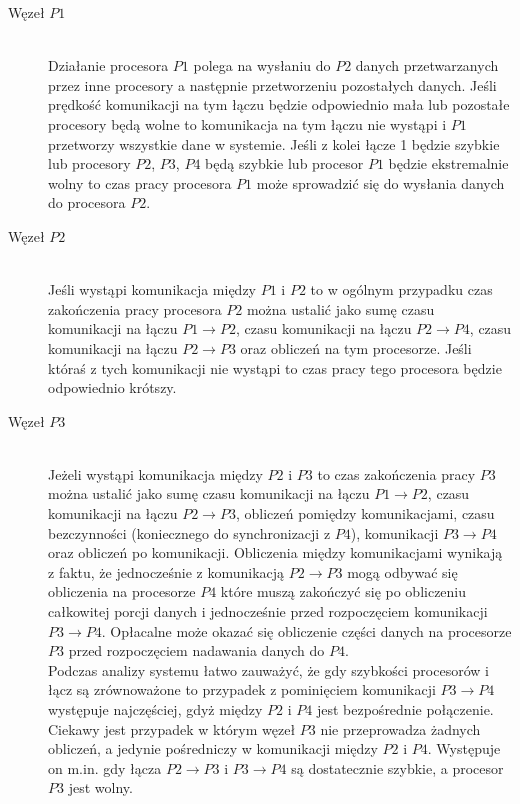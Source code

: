 \begin{description}

\item[Węzeł $P1$] \hfill \\

Działanie procesora $P1$ polega na wysłaniu do $P2$ danych przetwarzanych przez inne procesory a następnie przetworzeniu pozostałych danych.
Jeśli prędkość komunikacji na tym łączu będzie odpowiednio mała lub pozostałe procesory będą wolne to komunikacja na tym łączu nie wystąpi
i $P1$ przetworzy wszystkie dane w systemie. Jeśli z kolei łącze 1 będzie szybkie lub procesory $P2$, $P3$, $P4$ będą szybkie
lub procesor $P1$ będzie ekstremalnie wolny to czas pracy procesora $P1$ może sprowadzić się do wysłania danych do procesora $P2$.

\item[Węzeł $P2$] \hfill \\

Jeśli wystąpi komunikacja między $P1$ i $P2$ to w ogólnym przypadku czas zakończenia pracy procesora $P2$ można ustalić jako sumę czasu komunikacji na łączu $P1 \to P2$,
czasu komunikacji na łączu $P2 \to P4$, czasu komunikacji na łączu $P2 \to P3$ oraz obliczeń na tym procesorze.
Jeśli któraś z tych komunikacji nie wystąpi to czas pracy tego procesora będzie odpowiednio krótszy.

\item[Węzeł $P3$] \hfill \\

Jeżeli wystąpi komunikacja między $P2$ i $P3$ to czas zakończenia pracy $P3$ można ustalić jako sumę czasu komunikacji na łączu $P1 \to P2$,
czasu komunikacji na łączu $P2 \to P3$, obliczeń pomiędzy komunikacjami, czasu bezczynności (koniecznego do synchronizacji z $P4$), komunikacji $P3 \to P4$ oraz obliczeń po komunikacji.
Obliczenia między komunikacjami wynikają z faktu, że jednocześnie z komunikacją $P2 \to P3$ mogą odbywać się obliczenia na procesorze $P4$
które muszą zakończyć się po obliczeniu całkowitej porcji danych i jednocześnie przed rozpoczęciem komunikacji $P3 \to P4$.
Opłacalne może okazać się obliczenie części danych na procesorze $P3$ przed rozpoczęciem nadawania danych do $P4$. \\

Podczas analizy systemu łatwo zauważyć, że gdy szybkości procesorów i łącz są zrównoważone to przypadek z pominięciem komunikacji $P3 \to P4$ występuje najczęściej,
gdyż między $P2$ i $P4$ jest bezpośrednie połączenie.
Ciekawy jest przypadek w którym węzeł $P3$ nie przeprowadza żadnych obliczeń, a jedynie pośredniczy w komunikacji między $P2$ i $P4$.
Występuje on m.in. gdy łącza $P2 \to P3$ i $P3 \to P4$ są dostatecznie szybkie, a procesor $P3$ jest wolny.


\end{description}
